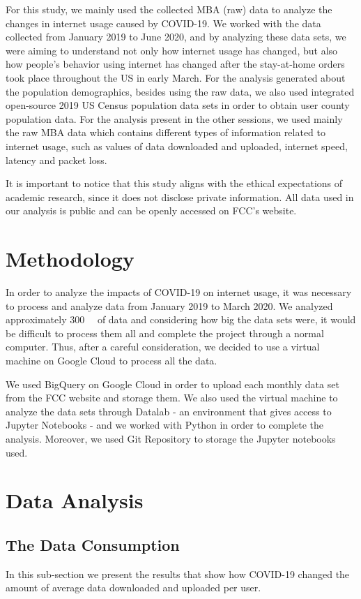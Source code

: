 \documentclass[conference,10pt]{IEEEtran}
\begin{document}
For this study, we mainly used the collected MBA (raw) data to analyze the changes in internet usage caused by COVID-19. We worked with the data collected from January 2019 to June 2020, and by analyzing these data sets, we were aiming to understand not only how internet usage has changed, but also how people's behavior using  internet has changed after the stay-at-home orders took place throughout the US in early March. For the analysis generated about the population demographics, besides using the raw data, we also used integrated open-source 2019 US Census population data sets in order to obtain user county population data. For the analysis present in the other sessions, we used mainly the raw MBA data which contains different types of information related to internet usage, such as values of data downloaded and uploaded, internet speed, latency and packet loss.

It is important to notice that this study aligns with the ethical expectations of academic research, since it does not disclose private information. All data used in our analysis is public and can be openly accessed on FCC's website.

\section{Methodology}
\label{sec:methodology}

In order to analyze the impacts of COVID-19 on internet usage, it was necessary to process and analyze data from January 2019 to March 2020. We analyzed approximately \SI{300}{\giga\byte} of data and considering how big the data sets were, it would be difficult to process them all and complete the project through a normal computer. Thus, after a careful consideration, we decided to use a virtual machine on Google Cloud to process all the data.

We used BigQuery on Google Cloud in order to upload each monthly data set from the FCC website and storage them. We also used the virtual machine to analyze the data sets through Datalab - an environment that gives access to Jupyter Notebooks - and we worked with Python in order to complete the analysis. Moreover, we used Git Repository to storage the Jupyter notebooks used.


\section{Data Analysis}
\label{sec:data-analysis}

\subsection{The Data Consumption}
\label{sec:the-data-consumption}
In this sub-section we present the results that show how COVID-19 changed the amount of average data downloaded and uploaded per user.
\end{document}
